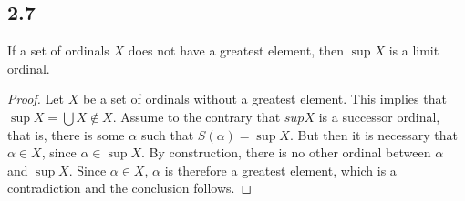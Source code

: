 \subsection*{2.7} If a set of ordinals $X$ does not have a greatest element, then $\sup X$ is a limit ordinal.

\begin{proof}
    Let $X$ be a set of ordinals without a greatest element. This implies that $\sup X = \bigcup X \notin X$. Assume to the contrary that $sup X$ is a successor ordinal, that is, there is some $\alpha$ such that $S(\alpha) = \sup X$. But then it is necessary that $\alpha \in X$, since $\alpha \in \sup X$. By construction, there is no other ordinal between $\alpha$ and $\sup X$. Since $\alpha \in X$, $\alpha$ is therefore a greatest element, which is a contradiction and the conclusion follows.
\end{proof}

